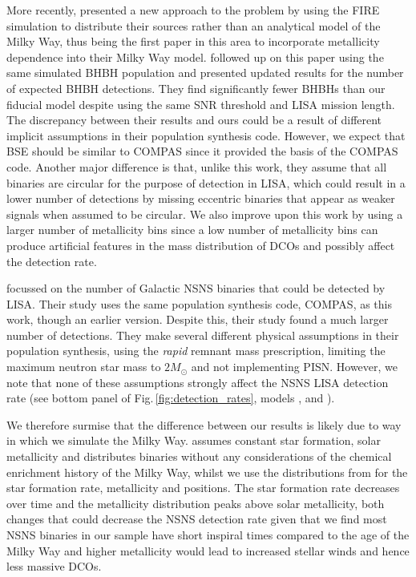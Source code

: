 More recently, \citet{Lamberts+2018} presented a new approach to the problem by using the FIRE simulation \citep{Hopkins+2014} to distribute their sources rather than an analytical model of the Milky Way, thus being the first paper in this area to incorporate metallicity dependence into their Milky Way model. \citet{Sesana+2020} followed up on this paper using the same simulated BHBH population and presented updated results for the number of expected BHBH detections. They find significantly fewer BHBHs than our fiducial model despite using the same SNR threshold and LISA mission length.
%
The discrepancy between their results and ours could be a result of different implicit assumptions in their population synthesis code. However, we expect that BSE should be similar to COMPAS since it provided the basis of the COMPAS code. Another major difference is that, unlike this work, they assume that all binaries are circular for the purpose of detection in LISA, which could result in a lower number of detections by missing eccentric binaries that appear as weaker signals when assumed to be circular. We also improve upon this work by using a larger number of metallicity bins since a low number of metallicity bins can produce artificial features in the mass distribution of DCOs and possibly affect the detection rate. 

\citet{Lau+2020} focussed on the number of Galactic NSNS binaries that could be detected by LISA. Their study uses the same population synthesis code, COMPAS, as this work, though an earlier version. Despite this, their study found a much larger number of detections. They make several different physical assumptions in their population synthesis, using the \citet{Fryer+2012} \textit{rapid} remnant mass prescription, limiting the maximum neutron star mass to $2 \unit{M_{\odot}}$ and not implementing PISN. However, we note that none of these assumptions strongly affect the NSNS LISA detection rate (see bottom panel of Fig.\,\ref{fig:detection_rates}, models \modRapid{}, \modNSLow{} and \modNoPISN{}).

We therefore surmise that the difference between our results is likely due to way in which we simulate the Milky Way. \citet{Lau+2020} assumes constant star formation, solar metallicity and distributes binaries without any considerations of the chemical enrichment history of the Milky Way, whilst we use the distributions from \citet{Frankel+2018} for the star formation rate, metallicity and positions. The \citet{Frankel+2018} star formation rate decreases over time and the metallicity distribution peaks above solar metallicity, both changes that could decrease the NSNS detection rate given that we find most NSNS binaries in our sample have short inspiral times compared to the age of the Milky Way and higher metallicity would lead to increased stellar winds and hence less massive DCOs.

